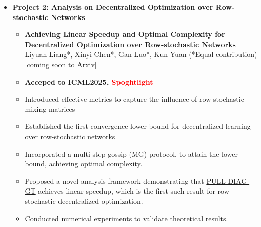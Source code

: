 \begin{itemize}
\begin{itemize}
              \item \textbf{Project 2: Analysis on Decentralized
Optimization over Row-stochastic Networks}
              \begin{itemize}
              \item \textbf{Achieving Linear Speedup and Optimal Complexity for Decentralized Optimization over Row-stochastic Networks}\\
              \href{https://lavaei.ieor.berkeley.edu/Group.html}{Liyuan Liang}*, \href{https://openreview.net/profile?id=~Xinyi_Chen9}{Xinyi Chen}*, \underline{Gan Luo}*, \href{https://kunyuan827.github.io}{Kun Yuan} (*Equal contribution) [coming soon to Arxiv]
                  \item {\textbf{Acceped to ICML2025, \textcolor{red}{Spoghtlight}}}
                  \item {Introduced effective metrics to capture the influence of row-stochastic mixing matrices}
                  \item {Established the first convergence lower bound for decentralized learning over row-stochastic networks}
                  \item {Incorporated a multi-step gossip (MG) protocol, to attain the lower bound, achieving optimal complexity.}
                  \item {Proposed a novel analysis framework demonstrating that \href{https://arxiv.org/pdf/1803.09169}{PULL-DIAG-GT} achieves linear speedup, which is the first such result for row-stochastic decentralized optimization.}
                  \item{Conducted numerical experiments to validate theoretical results.}
              \end{itemize}
          \end{itemize}


\end{itemize}
